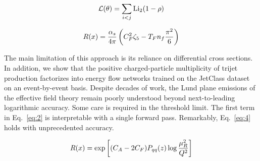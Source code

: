 \begin{equation}
  \mathcal{L}(\theta) = \sum_{i<j} \mathrm{Li}_{2}(1 - \rho)
  \label{eq:2}
\end{equation}

\begin{equation}
  R(x) = \frac{\alpha_s}{4\pi} \left( C_F^2 \zeta_{5} - T_F n_f \frac{\pi^2}{6} \right)
  \label{eq:4}
\end{equation}

The main limitation of this approach is its reliance on differential
cross sections. In addition, we show that the positive charged-particle
multiplicity of trijet production factorizes into energy flow networks
trained on the JetClass dataset on an event-by-event basis. Despite
decades of work, the Lund plane emissions of the effective field theory
remain poorly understood beyond next-to-leading logarithmic accuracy.
Some care is required in the threshold limit. The first term in
Eq.~\eqref{eq:2} is interpretable with a single forward pass.
Remarkably, Eq.~\eqref{eq:4} holds with unprecedented accuracy.

\begin{equation}
  R(x) = \exp\left[(C_A - 2C_F) P_{qq}(z) \log\frac{\mu_R^2}{Q^2}\right]
  \label{eq:5}
\end{equation}

